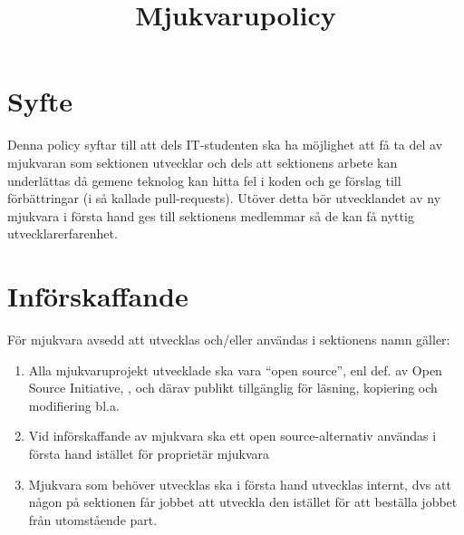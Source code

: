 \documentclass[11pt, includeaddress]{../../classes/cthit}
\begin{document}
\title{Mjukvarupolicy}
\maketitle

\thispagestyle{empty}

\newpage

\makeheadfoot%

\setcounter{tocdepth}{2}
\setcounter{page}{1}
\tableofcontents

\newpage

\section{Syfte}
Denna policy syftar till att dels IT-studenten ska ha möjlighet att få ta del av mjukvaran som sektionen utvecklar och dels att sektionens arbete kan underlättas då gemene teknolog kan hitta fel i koden och ge förslag till förbättringar (i så kallade pull-requests). Utöver detta bör utvecklandet av ny mjukvara i första hand ges till sektionens medlemmar så de kan få nyttig utvecklarerfarenhet.

\section{Införskaffande}
För mjukvara avsedd att utvecklas och/eller användas i sektionens namn gäller:
\begin{enumerate}
	\item Alla mjukvaruprojekt utvecklade ska vara  ``open source'', enl def. av Open Source Initiative, , och därav publikt tillgänglig för läsning, kopiering och modifiering bl.a. 
	\item Vid införskaffande av mjukvara ska ett open source-alternativ användas i första hand istället för proprietär mjukvara
 	\item Mjukvara som behöver utvecklas ska i första hand utvecklas internt, dvs att någon på sektionen får jobbet att utveckla den istället för att beställa jobbet från utomstående part.
\end{enumerate}
\end{document}

